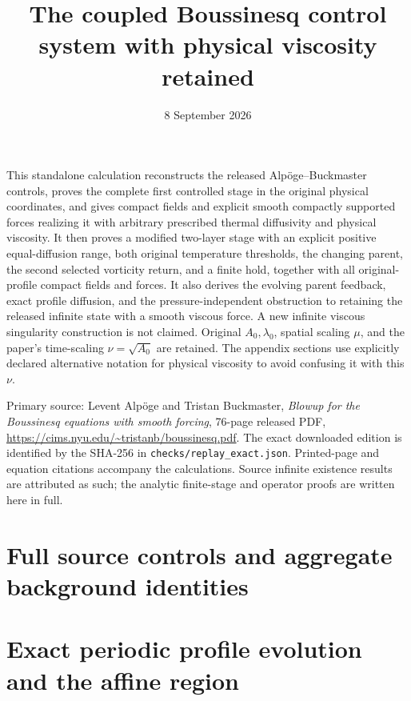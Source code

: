 \documentclass[11pt]{article}
\title{The coupled Boussinesq control system with physical viscosity retained}
\author{}
\date{8 September 2026}
\begin{document}
\maketitle
\noindent This standalone calculation reconstructs the released
Alp\"oge--Buckmaster controls, proves the complete first controlled stage
in the original physical coordinates, and gives compact fields and
explicit smooth compactly supported forces realizing it with arbitrary
prescribed thermal diffusivity and physical viscosity. It then proves
a modified two-layer stage with an explicit positive equal-diffusion
range, both original temperature thresholds, the changing parent,
the second selected vorticity return, and a finite hold, together
with all original-profile compact fields and forces. It also derives
the evolving parent feedback, exact profile diffusion, and the
pressure-independent obstruction to retaining the released infinite
state with a smooth viscous force. A new infinite viscous singularity
construction is not claimed. Original $A_0,\lambda_0$, spatial scaling
$\mu$, and the paper's time-scaling $\nu=\sqrt{A_0}$ are retained.
The appendix sections use explicitly declared alternative notation for
physical viscosity to avoid confusing it with this $\nu$.

\medskip
\noindent Primary source: Levent Alp\"oge and Tristan Buckmaster,
\emph{Blowup for the Boussinesq equations with smooth forcing},
76-page released PDF,
\url{https://cims.nyu.edu/~tristanb/boussinesq.pdf}.
The exact downloaded edition is identified by the SHA-256 in
\texttt{checks/replay\_exact.json}. Printed-page and equation
citations accompany the calculations. Source infinite existence
results are attributed as such; the analytic finite-stage and
operator proofs are written here in full.
\setcounter{tocdepth}{1}
\tableofcontents
\clearpage








\appendix
\clearpage
\section{Full source controls and aggregate background identities}

\clearpage
\section{Exact periodic profile evolution and the affine region}
\begingroup
\let\section\subsection

\endgroup
\end{document}

